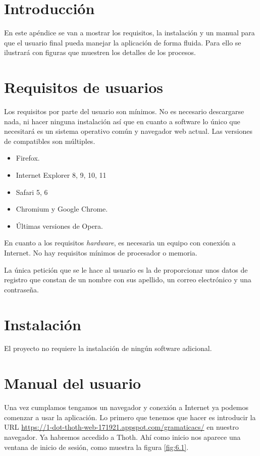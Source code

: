 
\section{Introducción}

En este apéndice se van a mostrar los requisitos, la instalación y un manual para que el usuario final pueda manejar la aplicación de forma fluida. Para ello se ilustrará con figuras que muestren los detalles de los procesos.

\section{Requisitos de usuarios}

Los requisitos por parte del usuario son mínimos. No es necesario descargarse nada, ni hacer ninguna instalación así que en cuanto a software lo único que necesitará es un sistema operativo común y navegador web actual. Las versiones de compatibles son múltiples.

\begin{itemize}
    \item Firefox.
    \item Internet Explorer 8, 9, 10, 11
    \item Safari 5, 6
    \item Chromium y Google Chrome.
    \item Últimas versiones de Opera.
\end{itemize}

En cuanto a los requisitos \emph{hardware}, es necesaria un equipo con conexión a Internet. No hay requisitos mínimos de procesador o memoria. 

La única petición que se le hace al usuario es la de proporcionar unos datos de registro que constan de un nombre con sus apellido, un correo electrónico y una contraseña.  

\section{Instalación}

El proyecto no requiere la instalación de ningún software adicional.

\section{Manual del usuario}

Una vez cumplamos tengamos un navegador y conexión a Internet ya podemos comenzar a usar la aplicación. Lo primero que tenemos que hacer es introducir la URL \url{https://1-dot-thoth-web-171921.appspot.com/gramaticacs/} en nuestro navegador. Ya habremos accedido a Thoth. Ahí como inicio nos aparece una ventana de inicio de sesión, como muestra la figura \ref{fig:6.1}.


